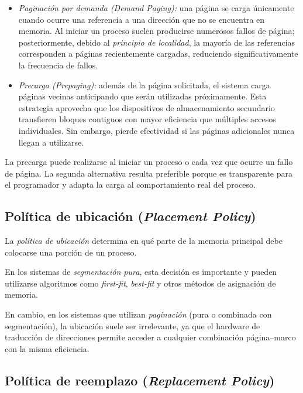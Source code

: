 \begin{itemize}
  \item \textit{Paginación por demanda (\textit{Demand Paging}):} una página se carga únicamente cuando ocurre una referencia a una dirección que no se encuentra en memoria. Al iniciar un proceso suelen producirse numerosos fallos de página; posteriormente, debido al \textit{principio de localidad}, la mayoría de las referencias corresponden a páginas recientemente cargadas, reduciendo significativamente la frecuencia de fallos.

  \item \textit{Precarga (\textit{Prepaging}):} además de la página solicitada, el sistema carga páginas vecinas anticipando que serán utilizadas próximamente. Esta estrategia aprovecha que los dispositivos de almacenamiento secundario transfieren bloques contiguos con mayor eficiencia que múltiples accesos individuales. Sin embargo, pierde efectividad si las páginas adicionales nunca llegan a utilizarse.
\end{itemize}

La precarga puede realizarse al iniciar un proceso o cada vez que ocurre un fallo de página. La segunda alternativa resulta preferible porque es transparente para el programador y adapta la carga al comportamiento real del proceso.

\subsection{Política de ubicación (\textit{Placement Policy})}

La \textit{política de ubicación} determina en qué parte de la memoria principal debe colocarse una porción de un proceso.

En los sistemas de \textit{segmentación pura}, esta decisión es importante y pueden utilizarse algoritmos como \textit{first-fit}, \textit{best-fit} y otros métodos de asignación de memoria.

En cambio, en los sistemas que utilizan \textit{paginación} (pura o combinada con segmentación), la ubicación suele ser irrelevante, ya que el hardware de traducción de direcciones permite acceder a cualquier combinación página--marco con la misma eficiencia.

\subsection{Política de reemplazo (\textit{Replacement Policy})}

